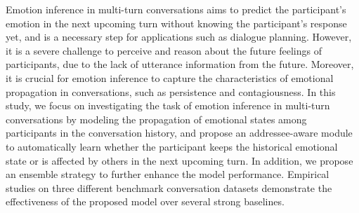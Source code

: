 Emotion inference in multi-turn conversations aims to predict the participant's emotion in the next upcoming turn without knowing the participant's response yet, and is a necessary step for applications such as dialogue planning. However, it is a severe challenge to perceive and reason about the future feelings of participants, due to the lack of utterance information from the future. Moreover, it is crucial for emotion inference to capture the characteristics of emotional propagation in conversations, such as persistence and contagiousness. In this study, we focus on investigating the task of emotion inference in multi-turn conversations by modeling the propagation of emotional states among participants in the conversation history, and propose an addressee-aware module to automatically learn whether the participant keeps the historical emotional state or is affected by others in the next upcoming turn. In addition, we propose an ensemble strategy to further enhance the model performance. Empirical studies on three different benchmark conversation datasets demonstrate the effectiveness of the proposed model over several strong baselines.

